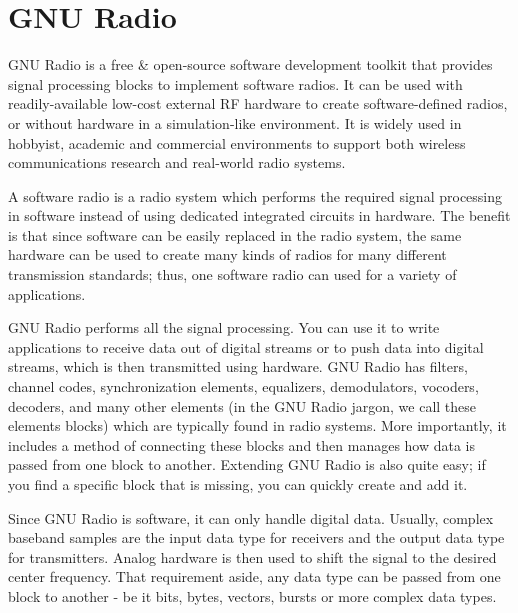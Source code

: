 \documentclass[a4paper,10pt]{article}
\begin{document}
\pgfplotsset{compat=1.3}



\section{GNU Radio}
GNU Radio\cite{bib:gnuradio} is a free \& open-source software development toolkit
that provides signal processing blocks to implement software radios.
It can be used with readily-available low-cost external RF hardware
to create software-defined radios, or without hardware in a simulation-like environment.
It is widely used in hobbyist, academic and commercial environments 
to support both wireless communications research and real-world radio systems.

A software radio is a radio system which performs the required signal processing 
in software instead of using dedicated integrated circuits in hardware.
The benefit is that since software can be easily replaced in the radio system,
the same hardware can be used to create many kinds of radios for many different transmission standards;
thus, one software radio can used for a variety of applications.

GNU Radio performs all the signal processing.
You can use it to write applications to receive data out of digital streams 
or to push data into digital streams, which is then transmitted using hardware.
GNU Radio has filters, channel codes, synchronization elements, equalizers,
demodulators, vocoders, decoders, and many other elements 
(in the GNU Radio jargon, we call these elements blocks) which are typically found in radio systems.
More importantly, it includes a method of connecting these blocks 
and then manages how data is passed from one block to another.
Extending GNU Radio is also quite easy; if you find a specific block that is missing, you can quickly create and add it.

Since GNU Radio is software, it can only handle digital data.
Usually, complex baseband samples are the input data type for receivers and the output data type for transmitters.
Analog hardware is then used to shift the signal to the desired center frequency.
That requirement aside, any data type can be passed from one block to another 
- be it bits, bytes, vectors, bursts or more complex data types.
\end{document}
